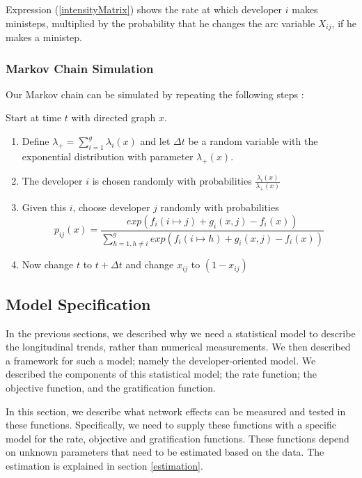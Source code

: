 \documentclass[11pt]{report}
\begin{document}
Expression (\ref{intensityMatrix}) shows the rate at which developer $i$ makes ministeps, multiplied by the probability that he changes the arc variable $X_{ij}$, if he makes a ministep.\\

\subsubsection{Markov Chain Simulation}
\label{MarkovChainSimulationSteps}
Our Markov chain can be simulated by repeating the following steps \cite{Snijders2004}:

Start at time $t$ with directed graph $x$. 
\begin{enumerate}
\item Define $\lambda_{+} = \sum_{i=1}^g \lambda_i(x)$ and let $\Delta t$ be a random variable with the exponential distribution with parameter $\lambda_{+}(x)$.
\item The developer $i$ is chosen randomly with probabilities $\frac{\lambda_{i}(x)}{\lambda_{+}(x)}$
\item Given this $i$, choose developer $j$ randomly with probabilities 
\begin{equation}
p_{ij}(x) = \frac{exp(f_i(i \mapsto j) + g_i(x, j) - f_i(x))}{\sum_{h=1, h \neq i}^{g} exp(f_i(i \mapsto h) + g_i(x, j) - f_i(x))} \nonumber
\end{equation}
\item Now change $t$ to $t + \Delta t$ and change $x_{ij}$ to $(1 - x_{ij})$
\end{enumerate}

\subsection{Model Specification}
In the previous sections, we described why we need a statistical model to describe the longitudinal trends, rather than numerical measurements. We then described a framework for such a model; namely the developer-oriented model. We described the components of this statistical model; the rate function; the objective function, and the gratification function.

In this section, we describe what network effects can be measured and tested in these functions. Specifically, we need to supply these functions with a specific model for the rate, objective and gratification functions. These functions depend on unknown parameters that need to be estimated based on the data. The estimation is explained in section \ref{estimation}. 
\end{document}
